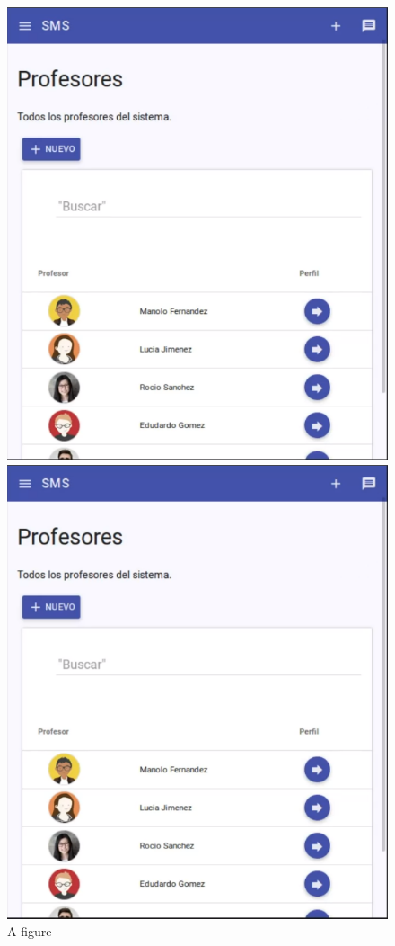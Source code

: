 \begin{figure}[H]
\centering
\begin{minipage}{.5\textwidth}
  \centering
  \includegraphics[scale=0.3]{img/snaps/teachers_list.png}
  \caption{A figure}
\end{minipage}%
\begin{minipage}{.5\textwidth}
  \centering
  \includegraphics[scale=0.3]{img/snaps/teachers_list.png}

\end{minipage}
\end{figure}
